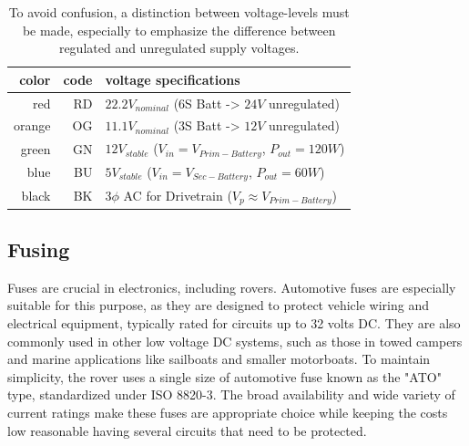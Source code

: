     \vspace{5mm} %
    
    \begin{table}[h]
        \centering
        \begin{tabular}{|r|r|l|} \hline 
             color&   code\footnotemark[1]&         voltage specifications\\ \hline 
             red&     RD&                           $22.2V_{nominal}$ (6S Batt -> $24V$ unregulated)\\ \hline 
             orange&  OG&                           $11.1V_{nominal}$ (3S Batt -> $12V$ unregulated)\\ \hline 
             green&   GN&                           $12V_{stable}$ ($V_{in}=V_{Prim-Battery}$, $P_{out}=120W$)\\ \hline 
             blue&    BU&                           $5V_{stable}$ ($V_{in}=V_{Sec-Battery}$, $P_{out}=60W$)\\ \hline 
             black&   BK&                           $3\phi$ AC for Drivetrain ($V_p \approx V_{Prim-Battery}$)
         \\ \hline\end{tabular}
        \caption{To avoid confusion, a distinction between voltage-levels must be made, especially to emphasize the difference between regulated and unregulated supply voltages. }
        \label{wiring_diagram_legend}
    \end{table}


    \vspace{5mm} %

    \subsection{Fusing}
    
    Fuses are crucial in electronics, including rovers. Automotive fuses are especially suitable for this purpose, as they are designed to protect vehicle wiring and electrical equipment, typically rated for circuits up to 32 volts DC. They are also commonly used in other low voltage DC systems, such as those in towed campers and marine applications like sailboats and smaller motorboats. To maintain simplicity, the rover uses a single size of automotive fuse known as the "ATO" type, standardized under ISO 8820-3. The broad availability and wide variety of current ratings make these fuses are appropriate choice while keeping the costs low reasonable having several circuits that need to be protected.

